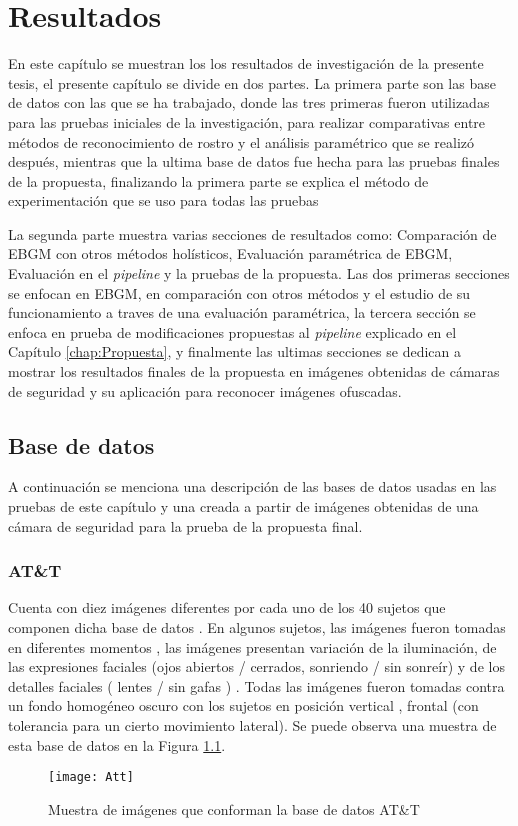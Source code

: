 \chapter{Resultados} \label{chap:Resultados}

En este capítulo se muestran los los resultados de investigación de la presente tesis, el presente capítulo se divide en dos partes. La primera parte son las base de datos con las que se ha trabajado, donde las tres primeras fueron utilizadas para las pruebas iniciales de la investigación, para realizar comparativas entre métodos de reconocimiento de rostro y el análisis paramétrico que se realizó después, mientras que la ultima base de datos fue hecha para las pruebas finales de la propuesta, finalizando la primera parte se explica el método de experimentación que se uso para todas las pruebas


La segunda parte muestra varias secciones de resultados como: Comparación de \ac{EBGM} con otros métodos holísticos, Evaluación paramétrica de \ac{EBGM}, Evaluación en el \textit{pipeline} y la pruebas de la propuesta. Las dos primeras secciones se enfocan en \ac{EBGM}, en comparación con otros métodos y el estudio de su funcionamiento a traves de una evaluación paramétrica, la tercera sección se enfoca en prueba de modificaciones propuestas al \textit{pipeline} explicado en el Capítulo \ref{chap:Propuesta}, y finalmente las ultimas secciones se dedican a mostrar los resultados finales de la propuesta en imágenes obtenidas de cámaras de seguridad y su aplicación para reconocer imágenes ofuscadas.

\section{Base de datos}
A continuación se menciona una descripción de las bases de datos usadas en las pruebas de este capítulo y una creada a partir de imágenes obtenidas de una cámara de seguridad para la prueba de la propuesta final.
\subsection{AT\&T}
Cuenta con diez imágenes diferentes por cada uno de los 40 sujetos que componen dicha base de datos\cite{ATT}  . En algunos sujetos, las imágenes fueron tomadas en diferentes momentos , las imágenes presentan variación de la iluminación, de las expresiones faciales (ojos abiertos / cerrados, sonriendo / sin sonreír) y de los detalles faciales ( lentes / sin gafas ) . Todas las imágenes fueron tomadas contra un fondo homogéneo oscuro con los sujetos en posición vertical , frontal (con tolerancia para un cierto movimiento lateral). Se puede observa una muestra de esta base de datos en la Figura \ref{Att}.
\begin{figure}[h]
	\centering
	\texttt{[image: Att]}
    \caption{Muestra de imágenes que conforman la base de datos AT\&T}
    \label{Att}
\end{figure}
